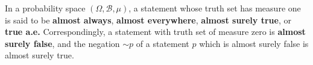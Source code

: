 In a probability space $(\Omega, \mathcal{B}, \mu)$, a statement whose truth set has measure one is said to be \textbf{almost always}, \textbf{almost everywhere}, \textbf{almost surely true}, or \textbf{true a.e.} Correspondingly, a statement with truth set of measure zero is \textbf{almost surely false}, and the negation $\sim p$ of a statement $p$ which is almost surely false is almost surely true.
